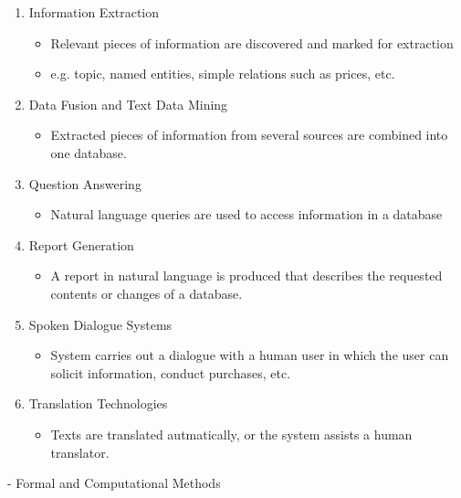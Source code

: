 \documentclass[11pt]{article}
\begin{document}
\begin{enumerate}
 \item Information Extraction
\begin{itemize}
 \item Relevant pieces of information are discovered and marked for extraction
 \item e.g. topic, named entities, simple relations such as prices, etc.
\end{itemize}
 \item Data Fusion and Text Data Mining
\begin{itemize}
 \item Extracted pieces of information from several sources are combined into one database.
\end{itemize}
 \item Question Answering
\begin{itemize}
 \item Natural language queries are used to access information in a database
\end{itemize}
 \item Report Generation
\begin{itemize}
 \item A report in natural language is produced that describes the requested contents or changes of a database.
\end{itemize}
 \item Spoken Dialogue Systems
\begin{itemize}
 \item System carries out a dialogue with a human user in which the user can solicit information, conduct purchases, etc.
\end{itemize}
 \item Translation Technologies
\begin{itemize}
 \item Texts are translated autmatically, or the system assists a human translator.
\end{itemize}
\end{enumerate}
- Formal and Computational Methods
\end{document}
